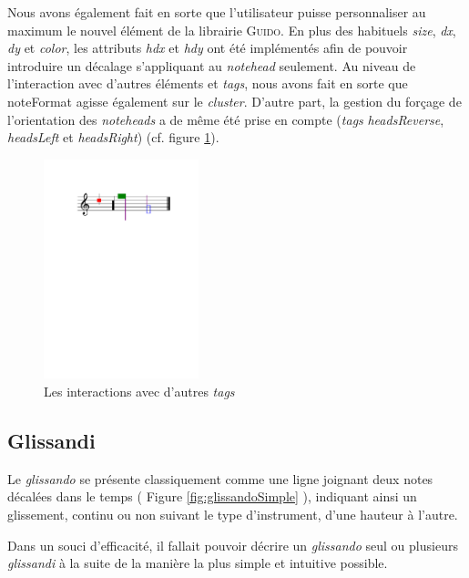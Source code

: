 \documentclass{article}
\newenvironment{gmncode}	{\vspace{-2mm}\small\verbatim}{\endverbatim\vspace{-2mm}}
\newcommand{\guido}			{\textsc{Guido}}
\begin{document}
Nous avons également fait en sorte que l'utilisateur puisse personnaliser au maximum le nouvel élément de la librairie \guido. En plus des habituels \emph{size}, \emph{dx}, \emph{dy} et \emph{color}, les attributs \emph{hdx} et \emph{hdy} ont été implémentés afin de pouvoir introduire un décalage s'appliquant au \emph{notehead} seulement. Au niveau de l'interaction avec d'autres éléments et \emph{tags}, nous avons fait en sorte que noteFormat agisse également sur le \emph{cluster}. D'autre part, la gestion du forçage de l'orientation des \emph{noteheads} a de même été prise en compte (\emph{tags} \emph{headsReverse}, \emph{headsLeft} et \emph{headsRight}) (cf. figure \ref{fig:clusterInteractions}).

%
\begin{figure}[h]
\centering
\begin{gmncode}
[
  \cluster<color="red", hdx=1, hdy=3>({a})
  \cluster<size=0.5>({f,c2})
  \noteFormat<color="purple">
  \headsReverse
  \cluster<color="green", size=2>({f, g2})
  \cluster<"blue">({d1/2, g})
]
\end{gmncode}
\includegraphics[width=45mm]{img/partitions/clusterInteractions.pdf}
\caption{Les interactions avec d'autres \emph{tags}}
\label{fig:clusterInteractions}
\end{figure}
%


\subsection{Glissandi}\label{subsec:glissando}

Le \emph{glissando} se présente classiquement comme une ligne joignant deux notes décalées dans le temps ( Figure \ref{fig:glissandoSimple} ), indiquant ainsi un glissement, continu ou non suivant le type d'instrument, d'une hauteur à l'autre.

Dans un souci d'efficacité, il fallait pouvoir décrire un \emph{glissando} seul ou plusieurs \emph{glissandi} à la suite de la manière la plus simple et intuitive possible. 
\end{document}
